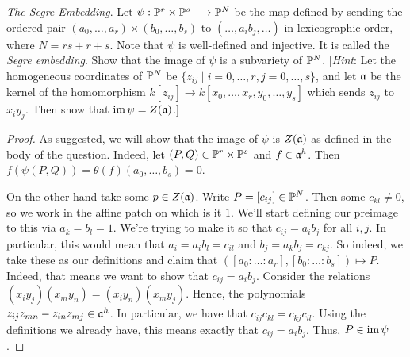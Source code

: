 \label{1.2.14}

\textit{The Segre Embedding}. Let $\psi: \P^r \times \P^s \longrightarrow \P^N$ be the map defined by sending the
ordered pair $(a_0 , \dots, a_r) \times (b_0 , \dots, b_s)$ to $(\dots, a_i b_j, \dots)$ in lexicographic order, where $N = rs + r + s$. Note that $\psi$ is well-defined and injective. It is called the
\textit{Segre embedding}. Show that the image of $\psi$ is a subvariety of $\P^N$. [\textit{Hint}: Let the
homogeneous coordinates of $\P^N$ be $\{z_{ij} \mid i = 0, \dots, r, j = 0, \dots, s\}$, and let $\a$ be the kernel of the homomorphism $k[{z_{ij}}] \longrightarrow k[x_0 , \dots, x_r, y_0 , \dots, y_s]$ which sends $z_{ij}$ to $x_i y_j$. Then show that $\im \psi = Z(\a)$.]

\begin{proof}
    As suggested, we will show that the image of $\psi$ is $Z(\a)$ as defined in the body of the question. Indeed, let $(P, Q) \in \P^r \times \P^s$ and $f \in \a^h$. Then $f(\psi(P, Q)) = \theta(f)(a_0, \dots, b_s) = 0$.

    On the other hand take some $p \in Z(\a)$. Write $P = [c_{ij}] \in \P^N$. Then some $c_{kl} \neq 0$, so we work in the affine patch on which is it $1$. We'll start defining our preimage to this via $a_k = b_l = 1$. We're trying to make it so that $c_{ij} = a_i b_j$ for all $i, j$. In particular, this would mean that $a_i = a_i b_l = c_{il}$ and $b_j = a_k b_j = c_{kj}$. So indeed, we take these as our definitions and claim that $([a_0 : \dots : a_r], [b_0 : \dots : b_s]) \mapsto P$. Indeed, that means we want to show that $c_{ij} = a_i b_j$. Consider the relations $(x_i y_j) (x_m y_n) = (x_i y_n)(x_m y_j)$. Hence, the polynomials $z_{ij} z_{mn} - z_{in} z_{mj} \in \a^h$. In particular, we have that $c_{ij} c_{kl} = c_{kj} c_{il}$. Using the definitions we already have, this means exactly that $c_{ij} = a_i b_j$. Thus, $P \in \im \psi$.
\end{proof}
